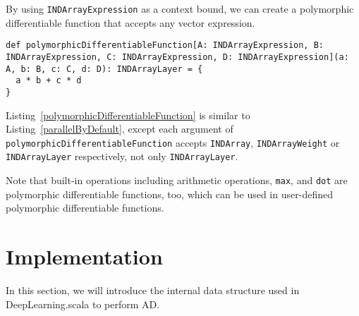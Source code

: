 By using \lstinline{INDArrayExpression} as a context bound, we can create a polymorphic differentiable function that accepts any vector expression.

\begin{lstlisting}[float={h t b p},caption={A polymorphic differentiable function}, label={polymorphicDifferentiableFunction}]
def polymorphicDifferentiableFunction[A: INDArrayExpression, B: INDArrayExpression, C: INDArrayExpression, D: INDArrayExpression](a: A, b: B, c: C, d: D): INDArrayLayer = {
  a * b + c * d
}
\end{lstlisting}

Listing~\ref{polymorphicDifferentiableFunction} is similar to Listing~\ref{parallelByDefault}, except each argument of \lstinline{polymorphicDifferentiableFunction} accepts \lstinline{INDArray}, \lstinline{INDArrayWeight} or \lstinline{INDArrayLayer} respectively, not only  \lstinline{INDArrayLayer}.

Note that built-in operations including arithmetic operations, \lstinline{max}, and \lstinline{dot} are polymorphic differentiable functions, too, which can be used in user-defined polymorphic \glspl{differentiable function}.

\section{Implementation}
\label{implementation}

In this section, we will introduce the internal data structure used in DeepLearning.scala to perform AD.


